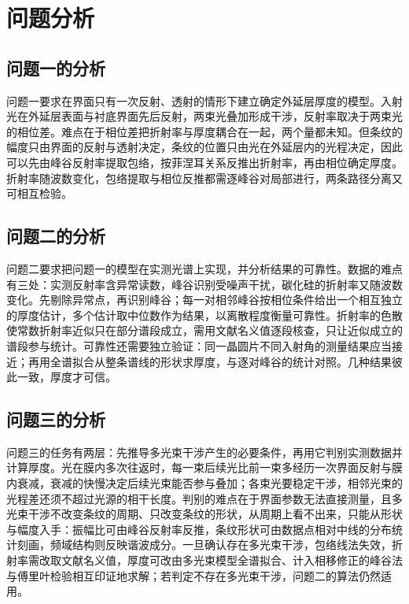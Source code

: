 \section{问题分析}

\subsection{问题一的分析}

问题一要求在界面只有一次反射、透射的情形下建立确定外延层厚度的模型。入射光在外延层表面与衬底界面先后反射，两束光叠加形成干涉，反射率取决于两束光的相位差。难点在于相位差把折射率与厚度耦合在一起，两个量都未知。但条纹的幅度只由界面的反射与透射决定，条纹的位置只由光在外延层内的光程决定，因此可以先由峰谷反射率提取包络，按菲涅耳关系反推出折射率，再由相位确定厚度。折射率随波数变化，包络提取与相位反推都需逐峰谷对局部进行，两条路径分离又可相互检验。

\subsection{问题二的分析}

问题二要求把问题一的模型在实测光谱上实现，并分析结果的可靠性。数据的难点有三处：实测反射率含异常读数，峰谷识别受噪声干扰，碳化硅的折射率又随波数变化。先剔除异常点，再识别峰谷；每一对相邻峰谷按相位条件给出一个相互独立的厚度估计，多个估计取中位数作为结果，以离散程度衡量可靠性。折射率的色散使常数折射率近似只在部分谱段成立，需用文献名义值逐段核查，只让近似成立的谱段参与统计。可靠性还需要独立验证：同一晶圆片不同入射角的测量结果应当接近；再用全谱拟合从整条谱线的形状求厚度，与逐对峰谷的统计对照。几种结果彼此一致，厚度才可信。

\subsection{问题三的分析}

问题三的任务有两层：先推导多光束干涉产生的必要条件，再用它判别实测数据并计算厚度。光在膜内多次往返时，每一束后续光比前一束多经历一次界面反射与膜内衰减，衰减的快慢决定后续光束能否参与叠加；各束光要稳定干涉，相邻光束的光程差还须不超过光源的相干长度。判别的难点在于界面参数无法直接测量，且多光束干涉不改变条纹的周期、只改变条纹的形状，从周期上看不出来，只能从形状与幅度入手：振幅比可由峰谷反射率反推，条纹形状可由数据点相对中线的分布统计刻画，频域结构则反映谐波成分。一旦确认存在多光束干涉，包络线法失效，折射率需改取文献名义值，厚度可改由多光束模型全谱拟合、计入相移修正的峰谷法与傅里叶检验相互印证地求解；若判定不存在多光束干涉，问题二的算法仍然适用。
